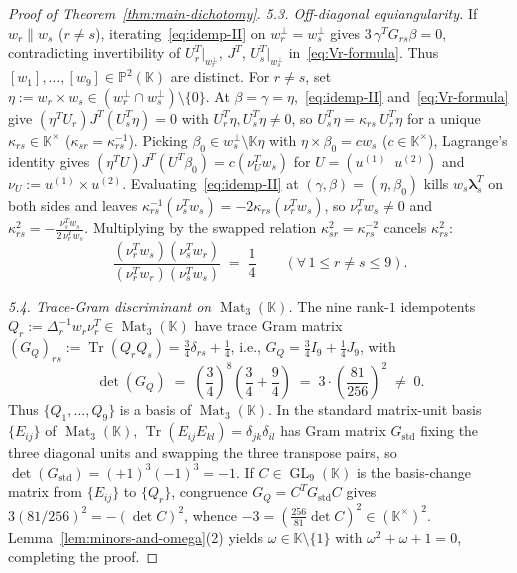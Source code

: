 \documentclass[11pt,reqno]{amsart}
\theoremstyle{definition}
\theoremstyle{remark}
\numberwithin{equation}{section}
\newcommand{\KK}{\mathbb{K}}
\newcommand{\PP}{\mathbb{P}}
\DeclareMathOperator{\Mat}{Mat}
\DeclareMathOperator{\GL}{GL}
\DeclareMathOperator{\Tr}{Tr}
\begin{document}
\begin{proof}[Proof of Theorem~\ref{thm:main-dichotomy}]
\emph{5.3. Off-diagonal equiangularity.}
If $w_r \parallel w_s$ ($r \neq s$), iterating~\eqref{eq:idemp-II} on $w_r^\perp = w_s^\perp$ gives $3\,\gamma^T G_{rs}\beta = 0$, contradicting invertibility of $U_r^T|_{w_r^\perp}$, $J^T$, $U_s^T|_{w_s^\perp}$ in~\eqref{eq:Vr-formula}. Thus $[w_1], \dots, [w_9] \in \PP^2(\KK)$ are distinct. For $r \neq s$, set $\eta := w_r \times w_s \in (w_r^\perp \cap w_s^\perp)\setminus\{0\}$. At $\beta = \gamma = \eta$,~\eqref{eq:idemp-II} and~\eqref{eq:Vr-formula} give $(\eta^T U_r) J^T (U_s^T \eta) = 0$ with $U_r^T \eta, U_s^T \eta \neq 0$, so $U_s^T \eta = \kappa_{rs}\, U_r^T \eta$ for a unique $\kappa_{rs} \in \KK^\times$ ($\kappa_{sr} = \kappa_{rs}^{-1}$). Picking $\beta_0 \in w_s^\perp \setminus \KK\eta$ with $\eta \times \beta_0 = c w_s$ ($c \in \KK^\times$), Lagrange's identity gives $(\eta^T U) J^T (U^T \beta_0) = c(\nu_U^T w_s)$ for $U = (u^{(1)}\;\; u^{(2)})$ and $\nu_U := u^{(1)} \times u^{(2)}$. Evaluating~\eqref{eq:idemp-II} at $(\gamma, \beta) = (\eta, \beta_0)$ kills $w_s \boldsymbol{\lambda}_s^T$ on both sides and leaves $\kappa_{rs}^{-1}(\nu_s^T w_s) = -2\kappa_{rs}(\nu_r^T w_s)$, so $\nu_r^T w_s \neq 0$ and $\kappa_{rs}^2 = -\frac{\nu_s^T w_s}{2\,\nu_r^T w_s}$. Multiplying by the swapped relation $\kappa_{sr}^2 = \kappa_{rs}^{-2}$ cancels $\kappa_{rs}^2$:
\begin{equation}\label{eq:biorthogonal-quarter}
  \frac{(\nu_r^T w_s)(\nu_s^T w_r)}{(\nu_r^T w_r)(\nu_s^T w_s)} \;=\; \frac{1}{4} \qquad (\forall\, 1 \le r \neq s \le 9).
\end{equation}

\emph{5.4. Trace-Gram discriminant on $\Mat_3(\KK)$.}
The nine rank-$1$ idempotents $Q_r := \Delta_r^{-1} w_r \nu_r^T \in \Mat_3(\KK)$ have trace Gram matrix $(G_Q)_{rs} := \Tr(Q_r Q_s) = \frac{3}{4}\delta_{rs} + \frac{1}{4}$, i.e., $G_Q = \frac{3}{4}I_9 + \frac{1}{4}J_9$, with
\begin{equation}\label{eq:det-GQ}
  \det(G_Q) \;=\; \left(\frac{3}{4}\right)^8 \left(\frac{3}{4} + \frac{9}{4}\right) \;=\; 3 \cdot \left(\frac{81}{256}\right)^2 \;\neq\; 0.
\end{equation}
Thus $\{Q_1, \dots, Q_9\}$ is a basis of $\Mat_3(\KK)$. In the standard matrix-unit basis $\{E_{ij}\}$ of $\Mat_3(\KK)$, $\Tr(E_{ij} E_{kl}) = \delta_{jk}\delta_{il}$ has Gram matrix $G_{\mathrm{std}}$ fixing the three diagonal units and swapping the three transpose pairs, so $\det(G_{\mathrm{std}}) = (+1)^3(-1)^3 = -1$. If $C \in \GL_9(\KK)$ is the basis-change matrix from $\{E_{ij}\}$ to $\{Q_r\}$, congruence $G_Q = C^T G_{\mathrm{std}} C$ gives $3(81/256)^2 = -(\det C)^2$, whence $-3 = (\frac{256}{81}\det C)^2 \in (\KK^\times)^2$. Lemma~\ref{lem:minors-and-omega}(2) yields $\omega \in \KK\setminus\{1\}$ with $\omega^2 + \omega + 1 = 0$, completing the proof.
\end{proof}
\end{document}
